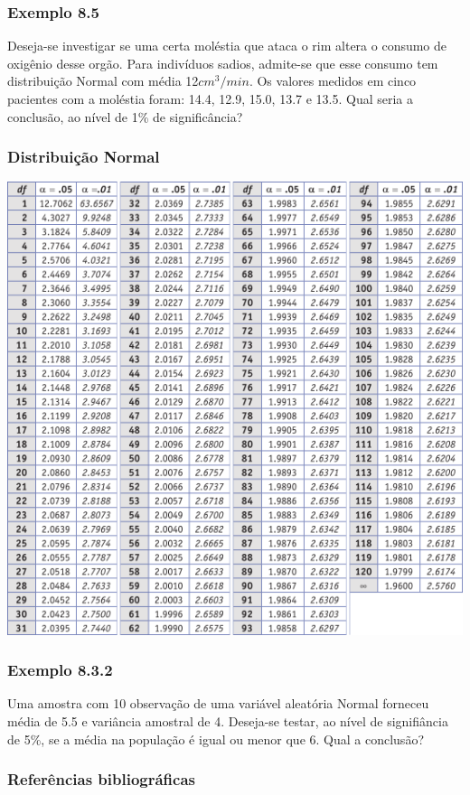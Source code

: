 \documentclass[11pt]{beamer}
\begin{document}
\begin{frame}
\frametitle{Exemplo 8.5}
Deseja-se investigar se uma certa moléstia que ataca o rim altera o consumo de oxigênio desse orgão. Para indivíduos sadios, admite-se que esse consumo tem distribuição Normal com média 12\(cm^3/min\). Os valores medidos em cinco pacientes com a moléstia foram: 14.4, 12.9, 15.0, 13.7 e 13.5. Qual seria a conclusão, ao nível de 1\% de significância?
\vspace{1in}
\vspace{1in}

\end{frame}

\begin{frame}
\frametitle{Distribuição Normal}

\begin{center}\includegraphics[width=0.7\linewidth]{figs/tabela_t} \end{center}
\end{frame}


\begin{frame}
\frametitle{Exemplo 8.3.2}
Uma amostra com 10 observação de uma variável aleatória Normal forneceu média de 5.5 e variância amostral de 4. Deseja-se testar, ao nível de signifiância de 5\%, se a média na população é igual ou menor que 6. Qual a conclusão?
\vspace{1in}
\vspace{1in}

\end{frame}

\begin{frame}
\frametitle{Referências bibliográficas}
\printbibliography
\end{frame}
\end{document}
